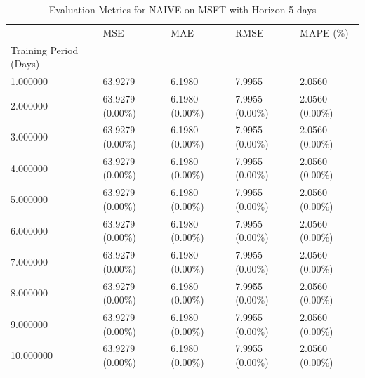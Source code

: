 \begin{table}
\caption{Evaluation Metrics for NAIVE on MSFT with Horizon 5 days}
\label{tab:naive_MSFT_h5_metrics}
\begin{tabular}{lllll}
\toprule
 & MSE & MAE & RMSE & MAPE (\%) \\
Training Period (Days) &  &  &  &  \\
\midrule
1.000000 & 63.9279 & 6.1980 & 7.9955 & 2.0560 \\
2.000000 & 63.9279 (0.00\%) & 6.1980 (0.00\%) & 7.9955 (0.00\%) & 2.0560 (0.00\%) \\
3.000000 & 63.9279 (0.00\%) & 6.1980 (0.00\%) & 7.9955 (0.00\%) & 2.0560 (0.00\%) \\
4.000000 & 63.9279 (0.00\%) & 6.1980 (0.00\%) & 7.9955 (0.00\%) & 2.0560 (0.00\%) \\
5.000000 & 63.9279 (0.00\%) & 6.1980 (0.00\%) & 7.9955 (0.00\%) & 2.0560 (0.00\%) \\
6.000000 & 63.9279 (0.00\%) & 6.1980 (0.00\%) & 7.9955 (0.00\%) & 2.0560 (0.00\%) \\
7.000000 & 63.9279 (0.00\%) & 6.1980 (0.00\%) & 7.9955 (0.00\%) & 2.0560 (0.00\%) \\
8.000000 & 63.9279 (0.00\%) & 6.1980 (0.00\%) & 7.9955 (0.00\%) & 2.0560 (0.00\%) \\
9.000000 & 63.9279 (0.00\%) & 6.1980 (0.00\%) & 7.9955 (0.00\%) & 2.0560 (0.00\%) \\
10.000000 & 63.9279 (0.00\%) & 6.1980 (0.00\%) & 7.9955 (0.00\%) & 2.0560 (0.00\%) \\
\bottomrule
\end{tabular}
\end{table}

